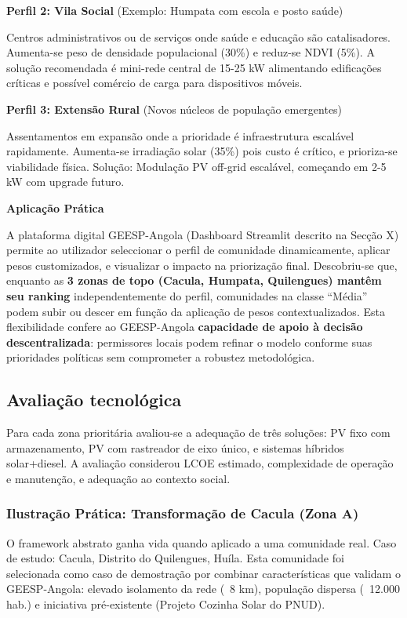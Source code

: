 \documentclass[12pt, a4paper]{article}
\begin{document}
\textbf{Perfil 2: Vila Social} (Exemplo: Humpata com escola e posto saúde)

Centros administrativos ou de serviços onde saúde e educação são catalisadores. 
Aumenta-se peso de densidade populacional (30\%) e reduz-se NDVI (5\%). 
A solução recomendada é mini-rede central de 15-25 kW alimentando edificações críticas 
e possível comércio de carga para dispositivos móveis.

\textbf{Perfil 3: Extensão Rural} (Novos núcleos de população emergentes)

Assentamentos em expansão onde a prioridade é infraestrutura escalável rapidamente. 
Aumenta-se irradiação solar (35\%) pois custo é crítico, e prioriza-se viabilidade 
física. Solução: Modulação PV off-grid escalável, começando em 2-5 kW com upgrade futuro.

\textbf{Aplicação Prática}

A plataforma digital GEESP-Angola (Dashboard Streamlit descrito na Secção X) permite 
ao utilizador seleccionar o perfil de comunidade dinamicamente, aplicar pesos customizados, 
e visualizar o impacto na priorização final. Descobriu-se que, enquanto as \textbf{3 zonas 
de topo (Cacula, Humpata, Quilengues) mantêm seu ranking} independentemente do perfil, 
comunidades na classe ``Média'' podem subir ou descer em função da aplicação de pesos 
contextualizados. Esta flexibilidade confere ao GEESP-Angola \textbf{capacidade de apoio 
à decisão descentralizada}: permissores locais podem refinar o modelo conforme suas 
prioridades políticas sem comprometer a robustez metodológica.

\subsection{Avaliação tecnológica}

Para cada zona prioritária avaliou-se a adequação de três soluções: PV fixo com armazenamento, PV com rastreador de eixo único, e sistemas híbridos solar+diesel. A avaliação considerou LCOE estimado, complexidade de operação e manutenção, e adequação ao contexto social.

\subsubsection{Ilustração Prática: Transformação de Cacula (Zona A)}

O framework abstrato ganha vida quando aplicado a uma comunidade real. Caso de estudo: 
Cacula, Distrito do Quilengues, Huíla. Esta comunidade foi selecionada como caso de 
demostração por combinar características que validam o GEESP-Angola: elevado isolamento 
da rede (~8 km), população dispersa (~12.000 hab.) e iniciativa pré-existente (Projeto 
Cozinha Solar do PNUD).
\end{document}
